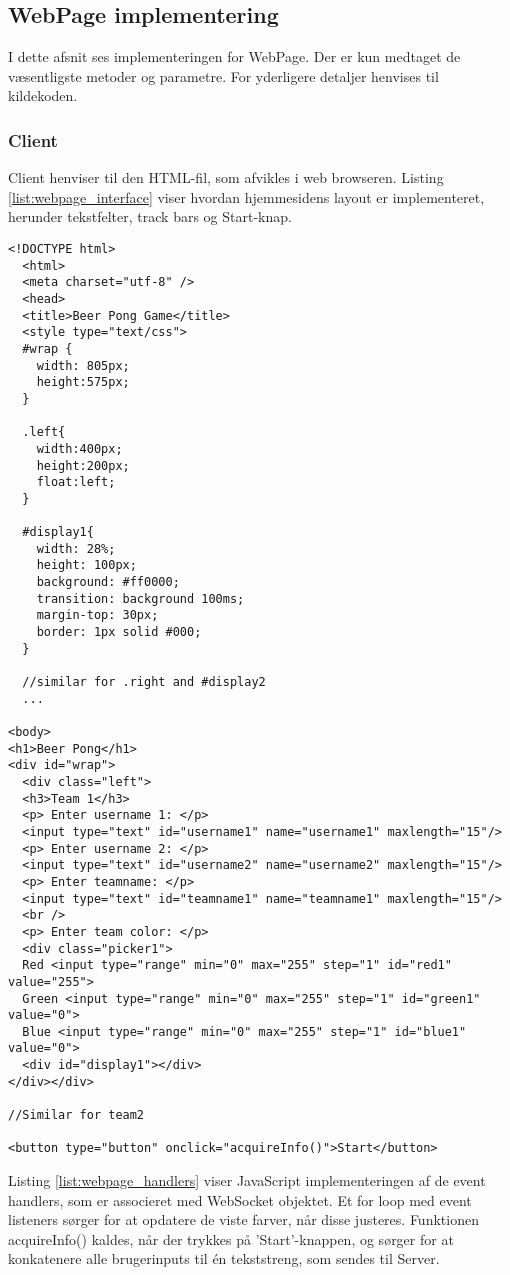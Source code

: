 \documentclass[Softwaredesign/Softwaredesign_main.tex]{subfiles}
\begin{document}
\subsection{WebPage implementering}\label{sec:webpage_implementering}
I dette afsnit ses implementeringen for WebPage. Der er kun medtaget de væsentligste metoder og parametre. For yderligere detaljer henvises til kildekoden. 
\subsubsection{Client}
Client henviser til den HTML-fil, som afvikles i web browseren. Listing \ref{list:webpage_interface} viser hvordan hjemmesidens layout er implementeret, herunder tekstfelter, track bars og Start-knap.
\begin{lstlisting}[caption={WebPage interface layout}, label=list:webpage_interface]
<!DOCTYPE html>
  <html>
  <meta charset="utf-8" />
  <head>
  <title>Beer Pong Game</title>
  <style type="text/css">
  #wrap {
    width: 805px;
    height:575px;
  }

  .left{
    width:400px;
    height:200px;
    float:left;
  }
  
  #display1{
    width: 28%;
    height: 100px;
    background: #ff0000;
    transition: background 100ms;
    margin-top: 30px;
    border: 1px solid #000;
  }
  
  //similar for .right and #display2
  ...
  
<body>
<h1>Beer Pong</h1>
<div id="wrap">
  <div class="left">
  <h3>Team 1</h3>
  <p> Enter username 1: </p>
  <input type="text" id="username1" name="username1" maxlength="15"/>
  <p> Enter username 2: </p>
  <input type="text" id="username2" name="username2" maxlength="15"/>
  <p> Enter teamname: </p>
  <input type="text" id="teamname1" name="teamname1" maxlength="15"/>
  <br />
  <p> Enter team color: </p>
  <div class="picker1">
  Red <input type="range" min="0" max="255" step="1" id="red1" value="255">
  Green <input type="range" min="0" max="255" step="1" id="green1" value="0">
  Blue <input type="range" min="0" max="255" step="1" id="blue1" value="0">
  <div id="display1"></div>
</div></div>
 
//Similar for team2 

<button type="button" onclick="acquireInfo()">Start</button>
\end{lstlisting}

Listing \ref{list:webpage_handlers} viser JavaScript implementeringen af de event handlers, som er associeret med WebSocket objektet. Et for loop med event listeners sørger for at opdatere de viste farver, når disse justeres. Funktionen acquireInfo() kaldes, når der trykkes på 'Start'-knappen, og sørger for at konkatenere alle brugerinputs til én tekststreng, som sendes til Server. 
\end{document}
